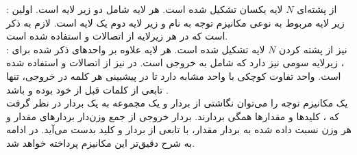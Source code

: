 \textbf{\encoder{}}:
\encoder{}
از پشته‌ای $N$ لایه یکسان تشکیل شده است. هر لایه شامل دو زیر لایه است. اولین زیر لایه مربوط به نوعی مکانیزم توجه به نام
و زیر لایه دوم یک لایه
است. لازم به ذکر است که در هر زیرلایه از اتصالات
و
استفاده شده است\cite{transformer}.
\\
\textbf{\decoder{}}:
\decoder{}
نیز از پشته کردن $N$ لایه تشکیل شده است. هر لایه علاوه بر واحد‌های ذکر شده برای \encoder{}، زیرلایه سومی نیز دارد که شامل
به خروجی \encoder{} است. در \decoder{} نیز از اتصالات \residual{} و \layernormalization{} استفاده شده است. واحد \multiheadselfattention{} تفاوت کوچکی با واحد مشابه \encoder{} دارد تا در پیشبینی هر کلمه در خروجی، تنها تابعی از کلمات قبل از خود بوده و \autoregressive{} باشد \cite{transformer}.
\\
یک مکانیزم توجه را می‌توان نگاشتی از بردار
و یک مجموعه \keyvaluepair{} به یک بردار در نظر گرفت که \query{}، کلیدها و مقدارها همگی بردارند. بردار خروجی از جمع وزن‌دار بردارهای مقدار و هر وزن نسبت داده شده به بردار مقدار، با تابعی از بردار \query{} و کلید بدست می‌آید. در ادامه به شرح دقیق‌تر این مکانیزم پرداخته خواهد شد.
